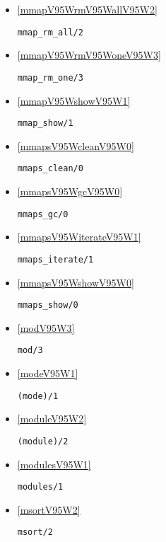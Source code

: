 \begin{itemize}
\item \ref{mmapV95WrmV95WallV95W2} 
\begin{verbatim}
mmap_rm_all/2
\end{verbatim}

\item \ref{mmapV95WrmV95WoneV95W3} 
\begin{verbatim}
mmap_rm_one/3
\end{verbatim}

\item \ref{mmapV95WshowV95W1} 
\begin{verbatim}
mmap_show/1
\end{verbatim}

\item \ref{mmapsV95WcleanV95W0} 
\begin{verbatim}
mmaps_clean/0
\end{verbatim}

\item \ref{mmapsV95WgcV95W0} 
\begin{verbatim}
mmaps_gc/0
\end{verbatim}

\item \ref{mmapsV95WiterateV95W1} 
\begin{verbatim}
mmaps_iterate/1
\end{verbatim}

\item \ref{mmapsV95WshowV95W0} 
\begin{verbatim}
mmaps_show/0
\end{verbatim}

\item \ref{modV95W3} 
\begin{verbatim}
mod/3
\end{verbatim}

\item \ref{modeV95W1} 
\begin{verbatim}
(mode)/1
\end{verbatim}

\item \ref{moduleV95W2} 
\begin{verbatim}
(module)/2
\end{verbatim}

\item \ref{modulesV95W1} 
\begin{verbatim}
modules/1
\end{verbatim}

\item \ref{msortV95W2} 
\begin{verbatim}
msort/2
\end{verbatim}


\end{itemize}
